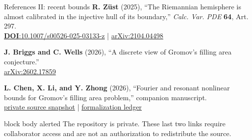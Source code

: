 \documentclass[11pt,aspectratio=169,usepdftitle=false]{beamer}
\begin{document}
\begin{frame}{References II: recent bounds}\label{bk:refs2}
  \scriptsize
  \textbf{R. Z\"ust} (2025), ``The Riemannian hemisphere is almost calibrated
  in the injective hull of its boundary,'' \emph{Calc. Var. PDE} \textbf{64},
  Art. 297.\\[-0.15em]
  \href{https://doi.org/10.1007/s00526-025-03133-z}{\textbf{DOI}:10.1007/s00526-025-03133-z}
  \;|\;
  \href{https://arxiv.org/abs/2104.04498}{arXiv:2104.04498}

  \vspace{0.42cm}
  \textbf{J. Briggs and C. Wells} (2026), ``A discrete view of Gromov's filling
  area conjecture.''\\[-0.15em]
  \href{https://arxiv.org/abs/2602.17859}{arXiv:2602.17859}

  \vspace{0.42cm}
  \textbf{L. Chen, X. Li, and Y. Zhong} (2026), ``Fourier and resonant nonlinear
  bounds for Gromov's filling area problem,'' companion manuscript.\\[-0.15em]
  \href{https://github.com/lowrank/gromov-filling-lower-bound/blob/f166e04054b397efdcb7c1ac5217ede715c1cfd0/fourier_resonant_filling_area_v3.tex}{private source snapshot}
  \;|\;
  \href{https://github.com/lowrank/gromov-filling-lower-bound/blob/f166e04054b397efdcb7c1ac5217ede715c1cfd0/FORMALIZATION.md}{formalization ledger}

  \vspace{0.52cm}
  \begin{beamercolorbox}[rounded=true,sep=0.48em]{block body alerted}
    \centering The repository is private. These last two links require
    collaborator access and are not an authorization to redistribute the source.
  \end{beamercolorbox}
\end{frame}
\end{document}

